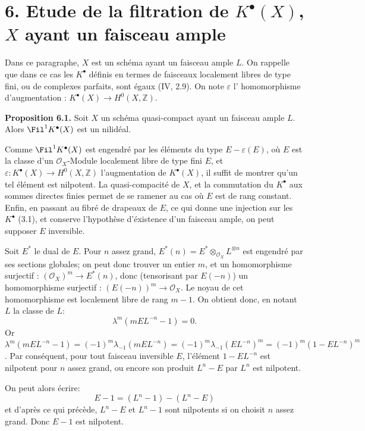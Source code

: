 \section*{6. Etude de la filtration de \texorpdfstring{$K^{\bullet}(X)$}{K^{\bullet}(X)}, $X$ ayant un faisceau ample}

Dans ce paragraphe, $X$ est un schéma ayant un faisceau ample $L$. On rappelle que dans ce cas les $K^{\bullet}$ définis en termes de faisceaux localement libres de type fini, ou de complexes parfaits, sont égaux (IV, 2.9). On note $\varepsilon$ l'%
homomorphisme d'augmentation : $K^{\bullet}(X)\longrightarrow H^0(X,\mathbb Z)$.

\textbf{Proposition 6.1.} Soit $X$ un schéma quasi-compact ayant un faisceau ample $L$. Alors $\Fil^1K^{\bullet}(X)$ est un nilidéal.

Comme $\Fil^1K^{\bullet}(X)$ est engendré par les éléments du type $E-\varepsilon(E)$, où $E$ est la classe d'un $\mathcal O_X$-Module localement libre de type fini $E$, et $\varepsilon:K^{\bullet}(X)\to H^0(X,\mathbb Z)$ l'augmentation de $K^{\bullet}(X)$, il suffit de montrer qu'un tel élément est nilpotent. La quasi-compacité de $X$, et la commutation du $K^{\bullet}$ aux sommes directes finies permet de se ramener au cas où $E$ est de rang constant. Enfin, en passant au fibré de drapeaux de $E$, ce qui donne une injection sur les $K^{\bullet}$ (3.1), et conserve l'hypothèse d'éxistence d'un faisceau ample, on peut supposer $E$ inversible.

Soit $E^*$ le dual de $E$. Pour $n$ assez grand, $E^*(n)=E^*\otimes_{\mathcal O_X}L^{\otimes n}$ est engendré par ses sections globales; on peut donc trouver un entier $m$, et un homomorphisme surjectif : $(\mathcal O_X)^m\longrightarrow E^*(n)$, donc (tensorisant par $E(-n)$) un homomorphisme surjectif : $(E(-n))^m\longrightarrow\mathcal O_X$. Le noyau de cet homomorphisme est localement libre de rang $m-1$. On obtient donc, en notant $L$ la classe de $L$:
\[
  \lambda^m(mEL^{-n}-1)=0 .
\]
Or $\lambda^m(mEL^{-n}-1)=(-1)^m\lambda_{-1}(mEL^{-n})=(-1)^m\lambda_{-1}(EL^{-n})^m=(-1)^m(1-EL^{-n})^m$. Par conséquent, pour tout faisceau inversible $E$, l'élément $1-EL^{-n}$ est nilpotent pour $n$ assez grand, ou encore son produit $L^n-E$ par $L^n$ est nilpotent.

On peut alors écrire:
\[
  E-1=(L^n-1)-(L^n-E)
\]
et d'après ce qui précède, $L^n-E$ et $L^n-1$ sont nilpotents si on choisit $n$ assez grand. Donc $E-1$ est nilpotent.


